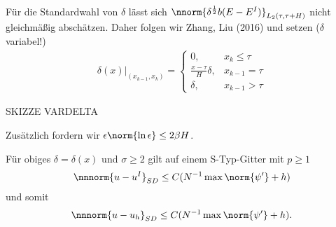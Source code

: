 Für die Standardwahl von $\delta$ lässt sich $\nnorm{\delta^{\frac 12} b (E - E^{I})}_{L_{2}(\tau, \tau + H)}$ nicht gleichmäßig abschätzen. Daher folgen wir Zhang, Liu (2016) und setzen ($\delta$ variabel!)
\begin{align*}
  \delta(x)|_{(x_{k-1}, x_{k})} =
  \begin{cases}
    0, & x_{k} \leq \tau \\
    \frac{x - \tau} H \delta, & x_{k-1} = \tau\\
    \delta, & x_{k-1} > \tau
  \end{cases}
\end{align*}

SKIZZE VARDELTA

Zusätzlich fordern wir $\epsilon \norm{\ln \epsilon} \leq 2 \beta H$. 
\begin{satz}\label{thm:6-22}
  Für obiges $\delta = \delta(x)$ und $\sigma \geq 2$ gilt auf einem S-Typ-Gitter mit $p\geq 1$
  \begin{align*}
    \nnnorm{u - u^{I}}_{SD} \leq C(N^{-1} \max\norm{ \psi'} + h)
  \end{align*}
  und somit
  \begin{align*}
    \nnnorm{u - u_{h}}_{SD} \leq C(N^{-1}  \max\norm{ \psi'} + h). 
  \end{align*}
\end{satz}

